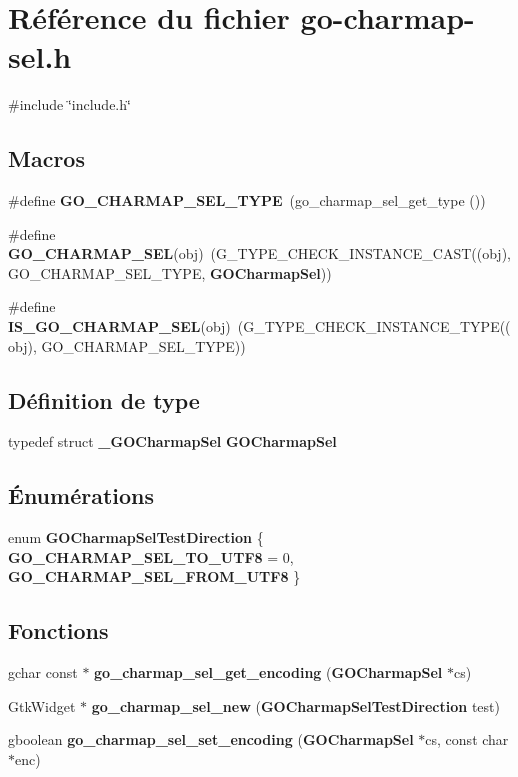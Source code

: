 \section{Référence du fichier go-\/charmap-\/sel.h}
\label{go-charmap-sel_8h}
{\ttfamily \#include \char`\"{}include.h\char`\"{}}\par
\subsection*{Macros}
\begin{DoxyCompactItemize}
\item 
\#define {\bf GO\_\-CHARMAP\_\-SEL\_\-TYPE}~(go\_\-charmap\_\-sel\_\-get\_\-type ())
\item 
\#define {\bf GO\_\-CHARMAP\_\-SEL}(obj)~(G\_\-TYPE\_\-CHECK\_\-INSTANCE\_\-CAST((obj), GO\_\-CHARMAP\_\-SEL\_\-TYPE, {\bf GOCharmapSel}))
\item 
\#define {\bf IS\_\-GO\_\-CHARMAP\_\-SEL}(obj)~(G\_\-TYPE\_\-CHECK\_\-INSTANCE\_\-TYPE((obj), GO\_\-CHARMAP\_\-SEL\_\-TYPE))
\end{DoxyCompactItemize}
\subsection*{Définition de type}
\begin{DoxyCompactItemize}
\item 
typedef struct {\bf \_\-GOCharmapSel} {\bf GOCharmapSel}
\end{DoxyCompactItemize}
\subsection*{Énumérations}
\begin{DoxyCompactItemize}
\item 
enum {\bf GOCharmapSelTestDirection} \{ {\bf GO\_\-CHARMAP\_\-SEL\_\-TO\_\-UTF8} =  0, 
{\bf GO\_\-CHARMAP\_\-SEL\_\-FROM\_\-UTF8}
 \}
\end{DoxyCompactItemize}
\subsection*{Fonctions}
\begin{DoxyCompactItemize}
\item 
gchar const $\ast$ {\bf go\_\-charmap\_\-sel\_\-get\_\-encoding} ({\bf GOCharmapSel} $\ast$cs)
\item 
GtkWidget $\ast$ {\bf go\_\-charmap\_\-sel\_\-new} ({\bf GOCharmapSelTestDirection} test)
\item 
gboolean {\bf go\_\-charmap\_\-sel\_\-set\_\-encoding} ({\bf GOCharmapSel} $\ast$cs, const char $\ast$enc)
\end{DoxyCompactItemize}


